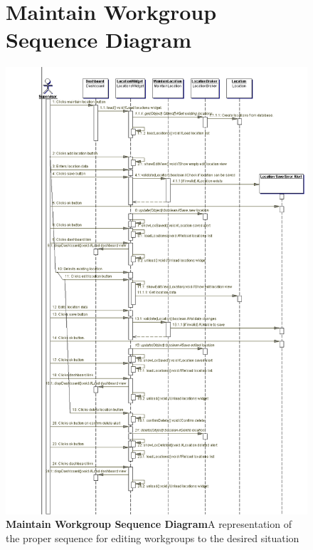 \documentclass[letterpaper,12pt]{report}
\begin{document}
\newpage
\begin{figure}[hbp]
 \section{Maintain Workgroup Sequence Diagram}
 \includegraphics[scale=0.5]{externals/MaintainLocationSequence.png}
 \caption{\small
\textbf{Maintain Workgroup Sequence Diagram}\newline A representation of the proper sequence for editing workgroups to the desired situation}\label{fig:seqMaintainWkgrp}
\end{figure}
\newpage
\end{document}
